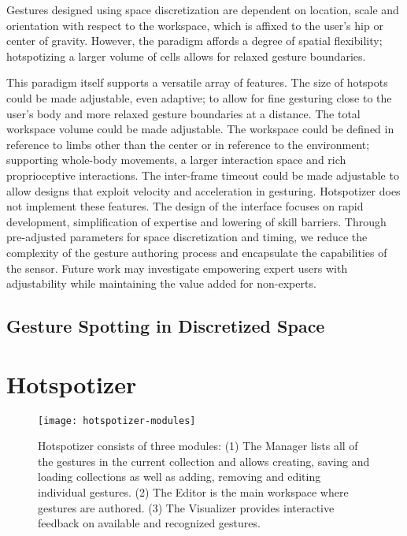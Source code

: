 Gestures designed using space discretization are dependent on location, scale and orientation with respect to the workspace, which is affixed to the user's hip or center of gravity. However, the paradigm affords a degree of spatial flexibility; hotspotizing a larger volume of cells allows for relaxed gesture boundaries.

This paradigm itself supports a versatile array of features. The size of hotspots could be made adjustable, even adaptive; to allow for fine gesturing close to the user’s body and more relaxed gesture boundaries at a distance. The total workspace volume could be made adjustable. The workspace could be defined in reference to limbs other than the center or in reference to the environment; supporting whole-body movements, a larger interaction space and rich proprioceptive interactions. The inter-frame timeout could be made adjustable to allow designs that exploit velocity and acceleration in gesturing. Hotspotizer does not implement these features. The design of the interface focuses on rapid development, simplification of expertise and lowering of skill barriers. Through pre-adjusted parameters for space discretization and timing, we reduce the complexity of the gesture authoring process and encapsulate the capabilities of the sensor. Future work may investigate empowering expert users with adjustability while maintaining the value added for non-experts.

\subsection{Gesture Spotting in Discretized Space}

\section{Hotspotizer}
\label{sec:hotspotizer}

\begin{figure}[ht]
\centering
\texttt{[image: hotspotizer-modules]}
\caption{Hotspotizer consists of three modules: (1) The Manager lists all of the gestures in the current collection and allows creating, saving and loading collections as well as adding, removing and editing individual gestures. (2) The Editor is the main workspace where gestures are authored. (3) The Visualizer provides interactive feedback on available and recognized gestures.}
\label{fig:hotspotizer-modules}
\end{figure}

